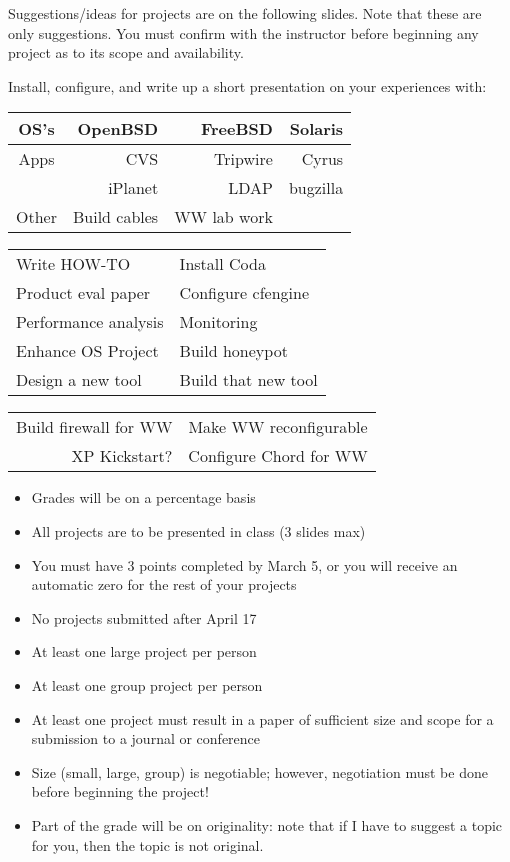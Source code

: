 \documentclass{slides}
\newcommand{\bi}{\begin{itemize}}
\newcommand{\ei}{\end{itemize}}
\begin{document}
Suggestions/ideas for projects are on the following slides.  Note that 
these are only suggestions.  You must confirm with the instructor before
beginning any project as to its scope and availability.


Install, configure, and write up a short presentation on your 
experiences with:

\begin{tabular}{|c||rrr|}
\hline
OS's 	& OpenBSD 	& FreeBSD	& Solaris \\
\hline
Apps 	& CVS 		& Tripwire 	& Cyrus \\
		& iPlanet	& LDAP		& bugzilla \\
\hline
Other		& Build cables	& WW lab work	& \\
\hline
\end{tabular}


\begin{tabular}{ll}
Write HOW-TO		& Install Coda \\
Product eval paper 	& Configure cfengine\\
Performance analysis	& Monitoring	\\
Enhance OS Project & Build honeypot \\
Design a new tool & Build that new tool \\
\end{tabular}


\begin{tabular}{rr}
Build firewall for WW & Make WW reconfigurable \\
XP Kickstart? & Configure Chord for WW\\
\end{tabular}


\bi
\item Grades will be on a percentage basis
\item All projects are to be presented in class (3 slides max)
\item You must have 3 points completed by March 5, or you will
	receive an automatic zero for the rest of your projects
\item No projects submitted after April 17
\item At least one large project per person
\item At least one group project per person
\item At least one project must result in a paper of
	sufficient size and scope for a submission to a journal
	or conference
\item Size (small, large, group) is negotiable; however, negotiation
	must be done before beginning the project!
\item Part of the grade will be on originality: note that if I 
	have to suggest a topic for you, then the topic is
	not original.
\ei
\end{document}
